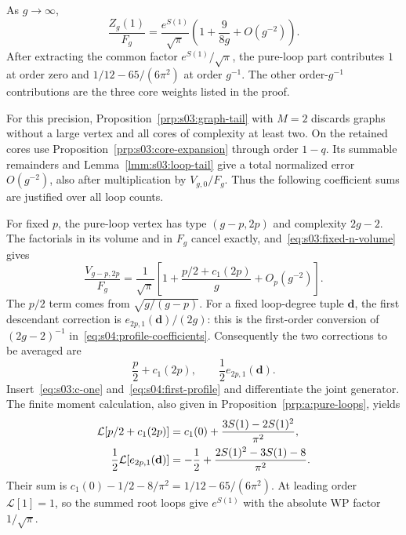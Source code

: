 \begin{prp}\label{prp:s04:first-correction}
As $g\to\infty$,
\begin{equation}\label{eq:s04:first-correction}
 \frac{Z_g(1)}{F_g}
 =\frac{e^{S(1)}}{\sqrt\pi}
       \left(1+\frac9{8g}+O(g^{-2})\right).
\end{equation}
After extracting the common factor $e^{S(1)}/\sqrt\pi$, the pure-loop
part contributes $1$ at order zero and
$1/12-65/(6\pi^2)$ at order $g^{-1}$. The other order-$g^{-1}$
contributions are the three core weights listed in the proof.
\end{prp}
\begin{prf}
For this precision, Proposition~\ref{prp:s03:graph-tail} with $M=2$
discards graphs without a large vertex and all cores of complexity
at least two. On the retained cores use
Proposition~\ref{prp:s03:core-expansion} through order $1-q$.
Its summable remainders and Lemma~\ref{lmm:s03:loop-tail} give a total
normalized error $O(g^{-2})$, also after multiplication by
$V_{g,0}/F_g$. Thus the following coefficient sums
are justified over all loop counts.

For fixed $p$, the pure-loop vertex has type $(g-p,2p)$ and complexity
$2g-2$. The factorials in its volume and in $F_g$ cancel exactly,
and~\eqref{eq:s03:fixed-n-volume} gives
\begin{equation}\label{eq:s04:pure-loop-volume}
 \frac{V_{g-p,2p}}{F_g}
 =\frac1{\sqrt\pi}
  \left[1+\frac{p/2+c_1(2p)}g+O_p(g^{-2})\right].
\end{equation}
The $p/2$ term comes from $\sqrt{g/(g-p)}$. For a fixed loop-degree
tuple $\mathbf d$, the first descendant correction is
$e_{2p,1}(\mathbf d)/(2g)$: this is the first-order conversion of
$(2g-2)^{-1}$ in~\eqref{eq:s04:profile-coefficients}.
Consequently the two corrections to be averaged are
\[
 \frac p2+c_1(2p),\qquad \frac12e_{2p,1}(\mathbf d).
\]
Insert~\eqref{eq:s03:c-one} and~\eqref{eq:s04:first-profile} and
differentiate the joint generator. The finite moment calculation,
also given in Proposition~\ref{prp:a:pure-loops}, yields
\begin{align}
 \mathcal L[p/2+c_1(2p)]
    &=c_1(0)+\frac{3S(1)-2S(1)^2}{\pi^2},\notag\\
 \frac12\mathcal L[e_{2p,1}(\mathbf d)]
    &=-\frac12+\frac{2S(1)^2-3S(1)-8}{\pi^2}.
 \label{eq:s04:first-loop-averages}
\end{align}
Their sum is
$c_1(0)-1/2-8/\pi^2=1/12-65/(6\pi^2)$.
At leading order $\mathcal L[1]=1$, so the summed root loops give
$e^{S(1)}$ with the absolute WP factor $1/\sqrt\pi$.


\end{prf}
